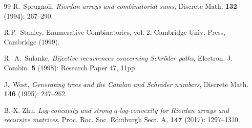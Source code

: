 \documentclass[11pt,reqno]{amsart}
\numberwithin{equation}{section}
\theoremstyle{plain}
\theoremstyle{definition}
\begin{document}
\begin{thebibliography}{99}
 R.~Sprugnoli, \textit{Riordan arrays and combinatorial sums}, Discrete Math. \textbf{132} (1994): 267--290.


 R.P.~Stanley, Enumerative Combinatorics, vol. 2, Cambridge Univ. Press, Cambridge (1999).

 R.~A.~Sulanke, \textit{Bijective recurrences concerning Schr\"oder paths}, Electron. J. Combin. {\bf 5} (1998): Research Paper 47, 11pp.

 J.~West, \textit{Generating trees and the Catalan and Schr\"oder numbers}, Discrete Math. {\bf 146} (1995): 247--262.

 B.-X. Zhu, \textit{Log-concavity and strong $q$-log-convexity for Riordan arrays and recursive matrices}, Proc. Roc. Soc. Edinburgh Sect. A, {\bf 147} (2017): 1297--1310.

\end{thebibliography}
\end{document}
